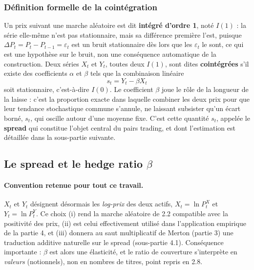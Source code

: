 \documentclass{article}
\begin{document}
\subsubsection*{Définition formelle de la cointégration}
Un prix suivant une marche aléatoire est dit \textbf{intégré d'ordre 1}, noté $I(1)$ : la série elle-même n'est pas stationnaire, mais sa différence première l'est, puisque $\Delta P_t = P_t - P_{t-1} = \varepsilon_t$ est un bruit stationnaire dès lors que les $\varepsilon_t$ le sont, ce qui est une hypothèse sur le bruit, non une conséquence automatique de la construction.
Deux séries $X_t$ et $Y_t$, toutes deux $I(1)$, sont dites \textbf{cointégrées} s'il existe des coefficients $\alpha$ et $\beta$ tels que la combinaison linéaire
\begin{equation}
s_t = Y_t - \beta X_t
\end{equation}
soit stationnaire, c'est-à-dire $I(0)$.  Le coefficient $\beta$ joue le rôle de la longueur de la laisse : c'est la proportion exacte dans laquelle combiner les deux prix pour que leur tendance stochastique commune s'annule, ne laissant subsister qu'un écart borné, $s_t$, qui oscille autour d'une moyenne fixe. C'est cette quantité $s_t$, appelée le \textbf{spread} qui constitue l'objet central du pairs trading, et dont l'estimation est détaillée dans la sous-partie suivante.

\subsection{Le spread et le hedge ratio $\beta$}
\paragraph{Convention retenue pour tout ce travail.} $X_t$ et $Y_t$ désignent désormais les \emph{log-prix} des deux actifs, $X_t=\ln P^X_t$ et $Y_t=\ln P^Y_t$. Ce choix (i) rend la marche aléatoire de 2.2 compatible avec la positivité des prix, (ii) est celui effectivement utilisé dans l'application empirique de la partie 4, et (iii) donnera au saut multiplicatif de Merton (partie 3) une traduction additive naturelle sur le spread (sous-partie 4.1). Conséquence importante : $\beta$ est alors une élasticité, et le ratio de couverture s'interprète en \emph{valeurs} (notionnels), non en nombres de titres, point repris en 2.8.
\end{document}
